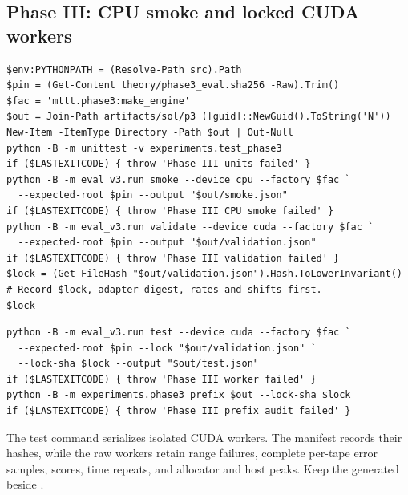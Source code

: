 \subsection{Phase III: CPU smoke and locked CUDA workers}
\begin{commandblock}
\begin{verbatim}
$env:PYTHONPATH = (Resolve-Path src).Path
$pin = (Get-Content theory/phase3_eval.sha256 -Raw).Trim()
$fac = 'mttt.phase3:make_engine'
$out = Join-Path artifacts/sol/p3 ([guid]::NewGuid().ToString('N'))
New-Item -ItemType Directory -Path $out | Out-Null
python -B -m unittest -v experiments.test_phase3
if ($LASTEXITCODE) { throw 'Phase III units failed' }
python -B -m eval_v3.run smoke --device cpu --factory $fac `
  --expected-root $pin --output "$out/smoke.json"
if ($LASTEXITCODE) { throw 'Phase III CPU smoke failed' }
python -B -m eval_v3.run validate --device cuda --factory $fac `
  --expected-root $pin --output "$out/validation.json"
if ($LASTEXITCODE) { throw 'Phase III validation failed' }
$lock = (Get-FileHash "$out/validation.json").Hash.ToLowerInvariant()
# Record $lock, adapter digest, rates and shifts first.
$lock
\end{verbatim}
\end{commandblock}
\begin{commandblock}
\begin{verbatim}
python -B -m eval_v3.run test --device cuda --factory $fac `
  --expected-root $pin --lock "$out/validation.json" `
  --lock-sha $lock --output "$out/test.json"
if ($LASTEXITCODE) { throw 'Phase III worker failed' }
python -B -m experiments.phase3_prefix $out --lock-sha $lock
if ($LASTEXITCODE) { throw 'Phase III prefix audit failed' }
\end{verbatim}
\end{commandblock}
The test command serializes isolated CUDA workers. The manifest records their hashes, while the raw workers retain range failures, complete per-tape error samples, scores, time repeats, and allocator and host peaks. Keep the generated  beside .

